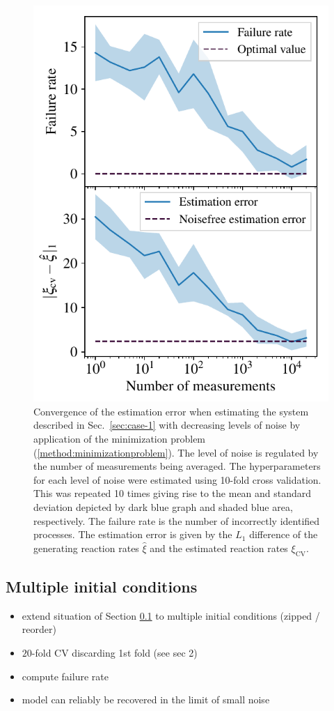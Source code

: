 \documentclass[oneside, abstracton, titlepage]{scrartcl}
\begin{document}
	\begin{figure}
		\centering
		\includegraphics[width=.5\columnwidth]{./figures_tex/case2}
		\caption{Convergence of the estimation error when estimating the system described in Sec.~\ref{sec:case-1} with decreasing levels of noise by application of the minimization problem (\ref{method:minimizationproblem}). The level of noise is regulated by the number of measurements being averaged. The hyperparameters for each level of noise were estimated using 10-fold cross validation. This was repeated 10 times giving rise to the mean and standard deviation depicted by dark blue graph and shaded blue area, respectively. The failure rate is the number of incorrectly identified processes. The estimation error is given by the $L_1$ difference of the generating reaction rates $\hat{\xi}$ and the estimated reaction rates $\xi_\mathrm{CV}$.}
		\label{fig:case2-convergence}
	\end{figure}

	\subsection{Multiple initial conditions}\label{sec:case-3}
	
	\begin{itemize}
		\item extend situation of Section \ref{sec:case-3} to multiple initial conditions (zipped / reorder)
		\item $20$-fold CV discarding 1st fold (see sec 2)
		\item compute failure rate
		\item model can reliably be recovered in the limit of small noise
	\end{itemize}
\end{document}
